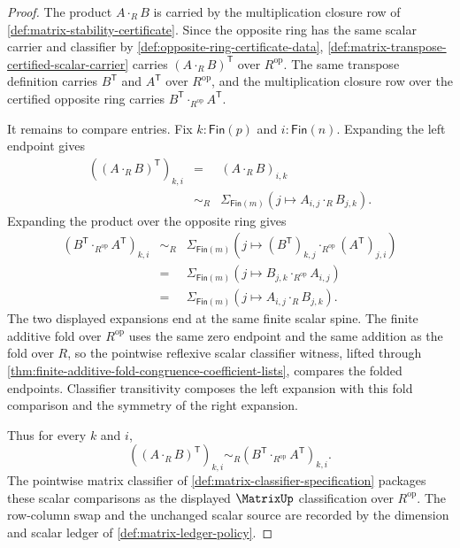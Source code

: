 \begin{proof}
The product $A\cdot_RB$ is carried by the multiplication closure row of \autoref{def:matrix-stability-certificate}. Since the opposite ring has the same scalar carrier and classifier by \autoref{def:opposite-ring-certificate-data}, \autoref{def:matrix-transpose-certified-scalar-carrier} carries $(A\cdot_RB)^{\mathsf{T}}$ over $R^{\mathrm{op}}$. The same transpose definition carries $B^{\mathsf{T}}$ and $A^{\mathsf{T}}$ over $R^{\mathrm{op}}$, and the multiplication closure row over the certified opposite ring carries $B^{\mathsf{T}}\cdot_{R^{\mathrm{op}}}A^{\mathsf{T}}$.

It remains to compare entries. Fix $k:\mathsf{Fin}(p)$ and $i:\mathsf{Fin}(n)$. Expanding the left endpoint gives
$$
\begin{array}{rcl}
((A\cdot_RB)^{\mathsf{T}})_{k,i}
&=&(A\cdot_RB)_{i,k} \\
&\sim_R&
\Sigma_{\mathsf{Fin}(m)}(j\mapsto A_{i,j}\cdot_RB_{j,k}).
\end{array}
$$
Expanding the product over the opposite ring gives
$$
\begin{array}{rcl}
(B^{\mathsf{T}}\cdot_{R^{\mathrm{op}}}A^{\mathsf{T}})_{k,i}
&\sim_R&
\Sigma_{\mathsf{Fin}(m)}(j\mapsto (B^{\mathsf{T}})_{k,j}\cdot_{R^{\mathrm{op}}}(A^{\mathsf{T}})_{j,i}) \\
&=&
\Sigma_{\mathsf{Fin}(m)}(j\mapsto B_{j,k}\cdot_{R^{\mathrm{op}}}A_{i,j}) \\
&=&
\Sigma_{\mathsf{Fin}(m)}(j\mapsto A_{i,j}\cdot_RB_{j,k}).
\end{array}
$$
The two displayed expansions end at the same finite scalar spine. The finite additive fold over $R^{\mathrm{op}}$ uses the same zero endpoint and the same addition as the fold over $R$, so the pointwise reflexive scalar classifier witness, lifted through \autoref{thm:finite-additive-fold-congruence-coefficient-lists}, compares the folded endpoints. Classifier transitivity composes the left expansion with this fold comparison and the symmetry of the right expansion.

Thus for every $k$ and $i$,
$$
((A\cdot_RB)^{\mathsf{T}})_{k,i}
\sim_R
(B^{\mathsf{T}}\cdot_{R^{\mathrm{op}}}A^{\mathsf{T}})_{k,i}.
$$
The pointwise matrix classifier of \autoref{def:matrix-classifier-specification} packages these scalar comparisons as the displayed $\MatrixUp$ classification over $R^{\mathrm{op}}$. The row-column swap and the unchanged scalar source are recorded by the dimension and scalar ledger of \autoref{def:matrix-ledger-policy}.
\end{proof}
